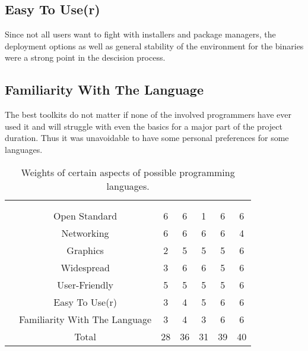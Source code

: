 \subsection*{Easy To Use(r)} Since not all users want to fight with installers and package managers, the deployment options as well as general stability of the environment for the binaries were a strong point in the descision process.

\subsection*{Familiarity With The Language} The best toolkits do not matter if none of the involved programmers have ever used it and will struggle with even the basics for a major part of the project duration. Thus it was unavoidable to have some personal preferences for some languages.

\begin{table}
\begin{centering}
\setlength{\extrarowheight}{2pt}
\begin{tabular}{*{7}{c|}}
    \multicolumn{2}{c}{}        & \multicolumn{2}{c}{}\\\cline{3-7}
    \multicolumn{1}{c}{}    &   & \parbox[t]{2mm}{}%
                                & \parbox[t]{2mm}{}%
                                & \parbox[t]{2mm}{}%
                                & \parbox[t]{2mm}{}%
                                & \parbox[t]{2mm}{} \\
                & Open Standard & 6 & 6 & 1 & 6 & 6\\
                   & Networking & 6 & 6 & 6 & 6 & 4\\
                     & Graphics & 2 & 5 & 5 & 5 & 6\\
                   & Widespread & 3 & 6 & 6 & 5 & 6\\
                & User-Friendly & 5 & 5 & 5 & 5 & 6\\
               & Easy To Use(r) & 3 & 4 & 5 & 6 & 6\\
& Familiarity With The Language & 3 & 4 & 3 & 6 & 6\\
                       & Total &28 &36 &31 &39 & 40\\
\end{tabular}
\caption{Weights of certain aspects of possible programming languages.}
\label{fig:gui_language_choices}
\end{centering}
\end{table}

